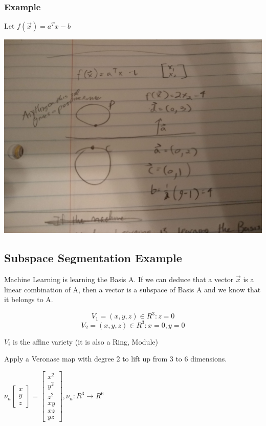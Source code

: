 \documentclass[11pt]{article}
\begin{document}
\subsubsection{Example}
\label{sec:orgb0a839a}

Let \(f(\vec x) = a^T x - b\)

\begin{center}
\includegraphics[width=.9\linewidth]{./resources/convex4.jpg}
\end{center}

\subsection{Subspace Segmentation Example}
\label{sec:org3375227}

Machine Learning is learning the Basis A. If we can deduce that a vector \(\vec
x\) is a linear combination of A, then a vector is a subspace of Basis A and we
know that it belongs to A.

$$
V_1 = {(x, y, z) \in R^3 : z = 0}
$$
$$
V_2 = {(x, y, z) \in R^3 : x = 0, y = 0}
$$

\(V_i\) is the affine variety (it is also a Ring, Module)

Apply a Veronase map with degree 2 to lift up from 3 to 6 dimensions.

\(\nu_n \begin{bmatrix} x\\ y\\ z \end{bmatrix} = \begin{bmatrix} x^2\\ y^2\\ z^2\\ xy\\ xz\\ yz \end{bmatrix}, \nu_n: R^3 \to R^6\)
\end{document}
